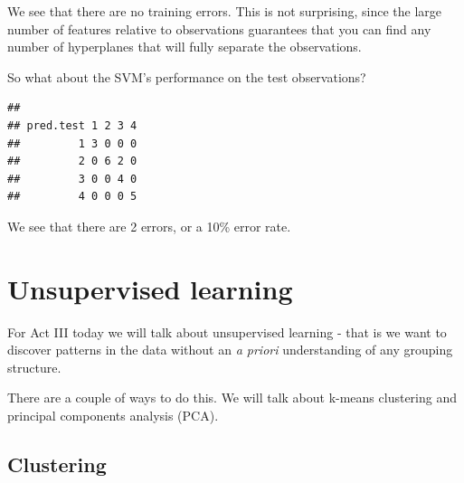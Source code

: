 \documentclass[
]{article}
\newenvironment{Shaded}{\begin{snugshade}}{\end{snugshade}}
\newcommand{\AttributeTok}[1]{\textcolor[rgb]{0.77,0.63,0.00}{#1}}
\newcommand{\CommentTok}[1]{\textcolor[rgb]{0.56,0.35,0.01}{\textit{#1}}}
\newcommand{\FunctionTok}[1]{\textcolor[rgb]{0.00,0.00,0.00}{#1}}
\newcommand{\NormalTok}[1]{#1}
\newcommand{\OtherTok}[1]{\textcolor[rgb]{0.56,0.35,0.01}{#1}}
\newcommand{\SpecialCharTok}[1]{\textcolor[rgb]{0.00,0.00,0.00}{#1}}
\begin{document}
We see that there are no training errors. This is not surprising, since
the large number of features relative to observations guarantees that
you can find any number of hyperplanes that will fully separate the
observations.

So what about the SVM's performance on the test observations?

\begin{Shaded}
\end{Shaded}

\begin{verbatim}
##          
## pred.test 1 2 3 4
##         1 3 0 0 0
##         2 0 6 2 0
##         3 0 0 4 0
##         4 0 0 0 5
\end{verbatim}

We see that there are 2 errors, or a 10\% error rate.

\hypertarget{unsupervised-learning}{%
\section{Unsupervised learning}\label{unsupervised-learning}}

For Act III today we will talk about unsupervised learning - that is we
want to discover patterns in the data without an \emph{a priori}
understanding of any grouping structure.

There are a couple of ways to do this. We will talk about k-means
clustering and principal components analysis (PCA).

\hypertarget{clustering}{%
\subsection{Clustering}\label{clustering}}
\end{document}
